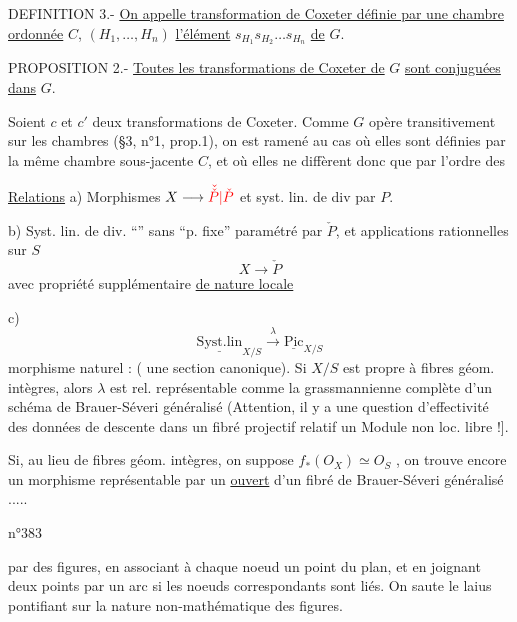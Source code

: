 DEFINITION 3.- \uline{On appelle transformation de Coxeter définie par une chambre ordonnée} $C$, $(H_1,\ldots,H_n)$ \uline{l'élément} $s_{H_1}s_{H_2}\ldots s_{H_n}$ \uline{de} $G$.

PROPOSITION 2.- \uline{Toutes les transformations de Coxeter de} $G$ \uline{sont conjuguées dans} $G$.

Soient $c$ et $c'$ deux transformations de Coxeter. Comme $G$ opère transitivement sur les chambres (§3, n°1, prop.1), on est ramené au cas où elles sont définies par la même chambre sous-jacente $C$, et où elles ne diffèrent donc que par l'ordre des

\uline{Relations} a) Morphismes $X\longrightarrow{\color{red}\check{\check{P}}|\check{P}}$ et syst. lin. de div  par $P$.

b) Syst. lin. de div. ``'' sans ``p. fixe'' paramétré par $\check{P}$, et applications rationnelles sur $S$
\[
X\longrightarrow\check{P}
\]
avec  propriété supplémentaire \uline{de nature locale}

c)
\[
\underline{\mathrm{Syst.lin}}_{X/S}\xrightarrow{\lambda}\underline{\mathrm{Pic}}_{X/S}
\]
morphisme naturel : (  une section canonique). Si $X/S$ est propre à fibres géom. intègres, alors $\lambda$ est rel. représentable comme la grassmannienne complète d'un schéma de Brauer-Séveri généralisé (Attention, il y a une question d'effectivité des données de descente dans un fibré projectif relatif un Module non loc. libre !].

Si, au lieu de fibres géom. intègres, on suppose $f_*(O_X)\simeq O_S$ , on trouve encore un morphisme représentable par un \uline{ouvert} d'un fibré  de Brauer-Séveri généralisé .....

\hfill n°383

par des figures, en associant à chaque noeud un point du plan, et en joignant deux points par un arc si les noeuds correspondants sont liés. On saute le laius pontifiant sur la nature non-mathématique des figures.

